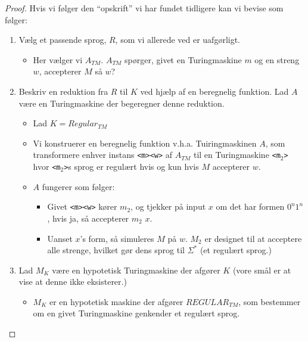 \begin{proof}
	Hvis vi følger den ``opskrift'' vi har fundet tidligere kan vi bevise som følger:
	\begin{enumerate}
		\item Vælg et passende sprog, $R$, som vi allerede ved er uafgørligt.
		      \begin{itemize}
			      \item Her vælger vi $A_{TM}$. $A_{TM}$ spørger, givet en Turingmaskine $m$ og en streng $w$, accepterer $M$ så $w$?
		      \end{itemize}
		\item Beskriv en reduktion fra $R$ til $K$ ved hjælp af en beregnelig funktion. Lad $A$ være en Turingmaskine der begeregner denne reduktion.
		      \begin{itemize}
			      \item Lad $K = Regular_{TM}$
			      \item Vi konstruerer en beregnelig funktion v.h.a. Tuiringmaskinen $A$, som transformere enhver instans \texttt{<m><w>} af $A_{TM}$ til en Turingmaskine \texttt{<m$_{2}$>} hvor \texttt{<m$_{2}$>}s sprog er regulært hvis og kun hvis $M$ accepterer $w$.
			      \item $A$ fungerer som følger:
			            \begin{itemize}
				            \item Givet \texttt{<m><w>} kører $m_{2}$, og tjekker på input $x$ om det har formen $0^{n}1^{n}$, hvis ja, så accepterer $m_{2}$ $x$.
				            \item Uanset $x$'s form, så simuleres $M$ på $w$. $M_{2}$ er designet til at acceptere alle strenge, hvilket gør dens sprog til $\Sigma^{*}$ (et regulært sprog.)
			            \end{itemize}
		      \end{itemize}
		\item Lad $M_{K}$ være en hypotetisk Turingmaskine der afgører $K$ (vore smål er at vise at denne ikke eksisterer.)
		      \begin{itemize}
			      \item $M_{K}$ er en hypotetisk maskine der afgører $REGULAR_{TM}$, som bestemmer om en givet Turingmaskine genkender et regulært sprog.
		      \end{itemize}


\end{enumerate}
\end{proof}
